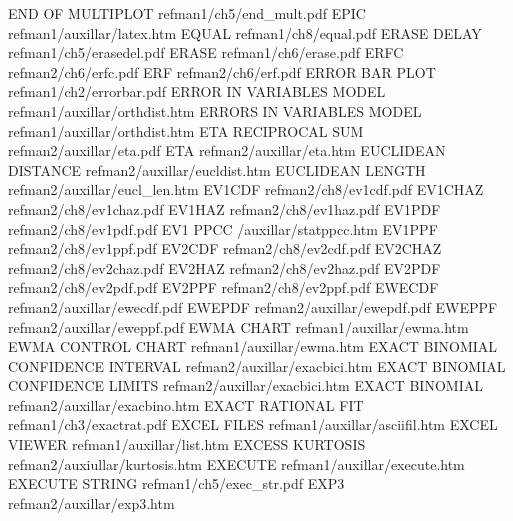 END OF MULTIPLOT                        refman1/ch5/end_mult.pdf
EPIC                                    refman1/auxillar/latex.htm
EQUAL                                   refman1/ch8/equal.pdf
ERASE DELAY                             refman1/ch5/erasedel.pdf
ERASE                                   refman1/ch6/erase.pdf
ERFC                                    refman2/ch6/erfc.pdf
ERF                                     refman2/ch6/erf.pdf
ERROR BAR PLOT                          refman1/ch2/errorbar.pdf
ERROR IN VARIABLES MODEL                refman1/auxillar/orthdist.htm
ERRORS IN VARIABLES MODEL               refman1/auxillar/orthdist.htm
ETA RECIPROCAL SUM                      refman2/auxillar/eta.pdf
ETA                                     refman2/auxillar/eta.htm
EUCLIDEAN DISTANCE                      refman2/auxillar/eucldist.htm
EUCLIDEAN LENGTH                        refman2/auxillar/eucl_len.htm
EV1CDF                                  refman2/ch8/ev1cdf.pdf
EV1CHAZ                                 refman2/ch8/ev1chaz.pdf
EV1HAZ                                  refman2/ch8/ev1haz.pdf
EV1PDF                                  refman2/ch8/ev1pdf.pdf
EV1 PPCC                                /auxillar/statppcc.htm
EV1PPF                                  refman2/ch8/ev1ppf.pdf
EV2CDF                                  refman2/ch8/ev2cdf.pdf
EV2CHAZ                                 refman2/ch8/ev2chaz.pdf
EV2HAZ                                  refman2/ch8/ev2haz.pdf
EV2PDF                                  refman2/ch8/ev2pdf.pdf
EV2PPF                                  refman2/ch8/ev2ppf.pdf
EWECDF                                  refman2/auxillar/ewecdf.pdf
EWEPDF                                  refman2/auxillar/ewepdf.pdf
EWEPPF                                  refman2/auxillar/eweppf.pdf
EWMA CHART                              refman1/auxillar/ewma.htm
EWMA CONTROL CHART                      refman1/auxillar/ewma.htm
EXACT BINOMIAL CONFIDENCE INTERVAL      refman2/auxillar/exacbici.htm
EXACT BINOMIAL CONFIDENCE LIMITS        refman2/auxillar/exacbici.htm
EXACT BINOMIAL                          refman2/auxillar/exacbino.htm
EXACT RATIONAL FIT                      refman1/ch3/exactrat.pdf
EXCEL FILES                             refman1/auxillar/asciifil.htm
EXCEL VIEWER                            refman1/auxillar/list.htm
EXCESS KURTOSIS                         refman2/auxiullar/kurtosis.htm
EXECUTE                                 refman1/auxillar/execute.htm
EXECUTE STRING                          refman1/ch5/exec_str.pdf
EXP3                                    refman2/auxillar/exp3.htm
